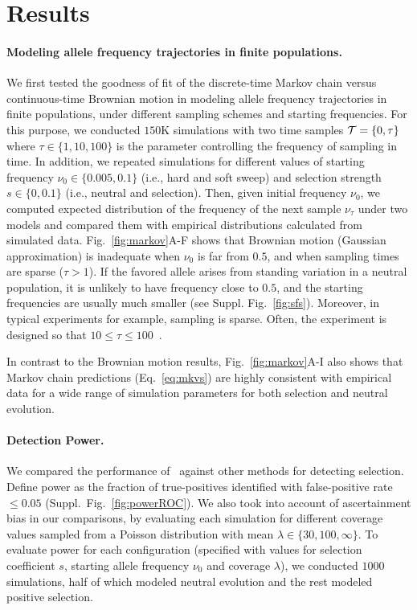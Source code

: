 \section{Results}
\paragraph{Modeling allele frequency trajectories in finite populations.} 
We first tested the goodness of fit of the discrete-time Markov chain
versus continuous-time Brownian motion in modeling allele frequency
trajectories in finite populations, under different sampling schemes
and starting frequencies.  For this purpose, we conducted $150$K
simulations with two time samples ${\cal T}=\{0,\tau\}$ where $\tau\in
\{1,10,100\}$ is the parameter controlling the frequency of sampling
in time.  In addition, we repeated simulations for different values of
starting frequency $\nu_0\in\{0.005,0.1\}$ (i.e., hard and soft sweep)
and selection strength $s\in\{0,0.1\}$ (i.e., neutral and
selection). Then, given initial frequency $\nu_0$, we computed
expected distribution of the frequency of the next sample $\nu_\tau$
under two models and compared them with empirical distributions
calculated from simulated data.  Fig.~\ref{fig:markov}A-F shows that
Brownian motion (Gaussian approximation) is inadequate when $\nu_0$ is
far from $0.5$, and when sampling times are sparse ($\tau>1$). If the
favored allele arises from standing variation in a neutral population,
it is unlikely to have frequency close to $0.5$, and the starting
frequencies are usually much smaller (see
Suppl. Fig.~\ref{fig:sfs}). Moreover, in typical \dmel experiments for
example, sampling is sparse. Often, the experiment is designed so that
$10\le\tau\le100$~\cite{kofler2013guide, orozco2012adaptation,
  zhou2011experimental}.

In contrast to the Brownian motion results, Fig.~\ref{fig:markov}A-I
also shows that Markov chain predictions (Eq.~\ref{eq:mkvs}) are
highly consistent with empirical data for a wide range of simulation
parameters for both selection and neutral evolution.

\paragraph{Detection Power.} 
We compared the performance of \comale\ against other methods for
detecting selection. Define power as the fraction of true-positives
identified with false-positive rate $\le 0.05$
(Suppl.~Fig.~\ref{fig:powerROC}). We also took into account of
ascertainment bias in our comparisons, by evaluating each simulation
for different coverage values sampled from a Poisson distribution with
mean $\lambda\in \{30,100,\infty\}$.  To evaluate power for each
configuration (specified with values for selection coefficient $s$,
starting allele frequency $\nu_0$ and coverage $\lambda$), we
conducted $1000$ simulations, half of which modeled neutral evolution
and the rest modeled positive selection.

